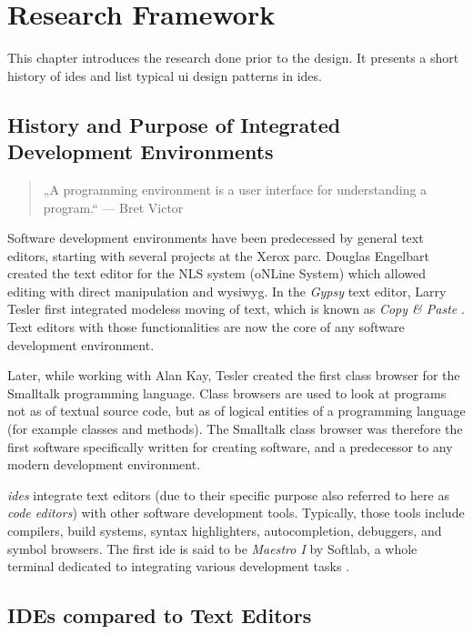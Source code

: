 \chapter{Research Framework}\label{research}

This chapter introduces the research done prior to the design. It
presents a short history of \glspl{ide} and list typical \gls{ui} design
patterns in \glspl{ide}.

\section{History and Purpose of Integrated Development
Environments}\label{history-and-purpose-of-integrated-development-environments}

\begin{quote}
„A programming environment is a user interface for understanding a
program.“ — Bret Victor \citeyear{victor}
\end{quote}

Software development environments have been predecessed by general text
editors, starting with several projects at the Xerox \gls{parc}. Douglas
Engelbart created the text editor for the NLS system (oNLine System)
which allowed editing with direct manipulation and \gls{wysiwyg}. In the
\emph{Gypsy} text editor, Larry Tesler first integrated modeless moving
of text, which is known as \emph{Copy \& Paste} \cite{moggridge}. Text
editors with those functionalities are now the core of any software
development environment.

Later, while working with Alan Kay, Tesler created the first class
browser for the Smalltalk programming language. Class browsers are used
to look at programs not as of textual source code, but as of logical
entities of a programming language (for example classes and methods).
The Smalltalk class browser was therefore the first software
specifically written for creating software, and a predecessor to any
modern development environment.

\emph{\glspl{ide}} integrate text editors (due to their specific purpose
also referred to here as \emph{code editors}) with other software
development tools. Typically, those tools include compilers, build
systems, syntax highlighters, autocompletion, debuggers, and symbol
browsers. The first \ac{ide} is said to be \emph{Maestro I} by Softlab,
a whole terminal dedicated to integrating various development tasks
\cite{maestro}.

\section{IDEs compared to Text
Editors}\label{ides-compared-to-text-editors}

